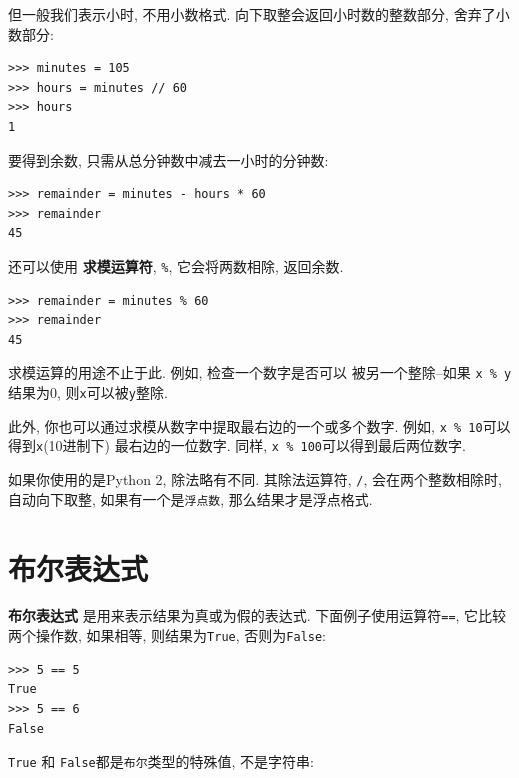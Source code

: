 \documentclass[10pt]{book}
\begin{document}
但一般我们表示小时, 不用小数格式. 
向下取整会返回小时数的整数部分, 舍弃了小数部分:

\begin{verbatim}
>>> minutes = 105
>>> hours = minutes // 60
>>> hours
1
\end{verbatim}

要得到余数, 只需从总分钟数中减去一小时的分钟数:

\begin{verbatim}
>>> remainder = minutes - hours * 60
>>> remainder
45
\end{verbatim}


还可以使用 {\bf 求模运算符},  \verb"%",  
它会将两数相除, 返回余数. 

\begin{verbatim}
>>> remainder = minutes % 60
>>> remainder
45
\end{verbatim}
%
求模运算的用途不止于此. 例如, 检查一个数字是否可以
被另一个整除--如果
{\tt x \% y}结果为0, 则{\tt x}可以被{\tt y}整除.

此外, 你也可以通过求模从数字中提取最右边的一个或多个数字. 
例如,  {\tt x \% 10}可以得到{\tt x}(10进制下) 最右边的一位数字. 
同样, {\tt x \% 100}可以得到最后两位数字. 

如果你使用的是Python 2, 除法略有不同. 
其除法运算符, \verb"/",  会在两个整数相除时, 自动向下取整, 
如果有一个是{\tt 浮点数}, 那么结果才是浮点格式. 


\section{布尔表达式}

{\bf 布尔表达式} 是用来表示结果为真或为假的表达式. 
下面例子使用运算符{\tt ==},  它比较两个操作数, 
如果相等, 则结果为{\tt True}, 否则为{\tt False}:

\begin{verbatim}
>>> 5 == 5
True
>>> 5 == 6
False
\end{verbatim}
%
{\tt True} 和 {\tt False}都是{\tt 布尔}类型的特殊值, 不是字符串:
\end{document}
